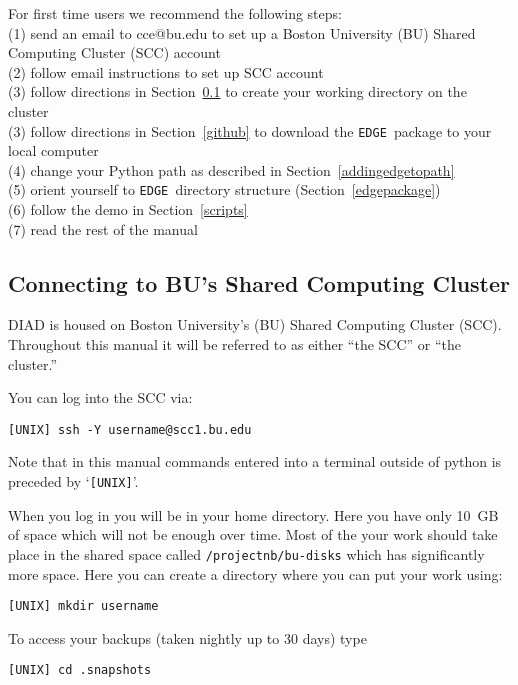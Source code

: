 \documentclass{article}
\newcommand{\edge}{\texttt{EDGE }}
\begin{document}
For first time users we recommend the following steps:\\
(1) send an email to cce@bu.edu to set up a Boston University (BU) Shared Computing Cluster (SCC) account \\
(2) follow email instructions to set up SCC account \\
(3) follow directions in Section~\ref{scc} to create your working directory on the cluster \\
(3) follow directions in Section~\ref{github} to download the \edge package to your local computer \\
(4) change your Python path as described in Section~\ref{addingedgetopath}  \\
(5) orient yourself to \edge directory structure (Section~\ref{edgepackage})\\
(6) follow the demo in Section~\ref{scripts} \\
(7) read the rest of the manual

\subsection{Connecting to BU's Shared Computing Cluster} \label{scc}

DIAD is housed on Boston University's (BU) Shared Computing Cluster (SCC).  Throughout this
manual it will be referred to as either ``the SCC'' or ``the cluster.''

You can log into the SCC via:

\vspace{2mm}
\texttt{[UNIX] ssh -Y username@scc1.bu.edu}
\vspace{2mm}

Note that in this manual commands entered into a terminal outside of python is preceded by `\texttt{[UNIX]}'.

When you log in you will be in your home directory.  Here you have only 10~GB of space which will not be enough over time. Most of the your work should take place in the shared space called \texttt{/projectnb/bu-disks} which has significantly more space.  Here you can create a directory where you can put your work using:

\vspace{2mm}
\texttt{[UNIX] mkdir username}
\vspace{2mm}

\noindent To access your backups (taken nightly up to 30 days) type

\vspace{2mm}
\texttt{[UNIX] cd .snapshots}
\vspace{2mm}
\end{document}
